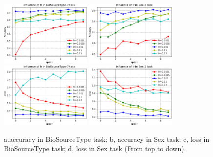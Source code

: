 \documentclass[sigconf]{acmart}
\begin{document}
	\begin{figure}[]
		\centering
		\includegraphics[width=0.4\textwidth]{../figs/lr_acc_bio.pdf}
		\includegraphics[width=0.4\textwidth]{../figs/lr_acc_sex.pdf}
		\includegraphics[width=0.4\textwidth]{../figs/lr_loss_bio.pdf}
		\includegraphics[width=0.4\textwidth]{../figs/lr_loss_sex.pdf}
		\caption{a.accuracy in BioSourceType task;  b, accuracy in Sex task; c, loss in BioSourceType task; d, loss in Sex task (From top to down). }
		\label{lr_result}
		\centering
	\end{figure}
	
	
\end{document}
